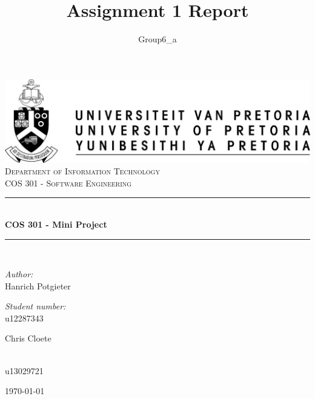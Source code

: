 \documentclass[a4paper,12pt]{report}
\author{Group6_a}
\title{ Assignment 1 Report}
\newcommand{\HRule}{\rule{\linewidth}{0.5mm}}
\begin{document}
\setlength{\parskip}{6pt}

\begin{titlepage}

\begin{center}
\includegraphics[width=1\textwidth]{./up-logo.jpg}\\[0.4cm]    
\textsc{\LARGE Department of Information Technology}\\[1.5cm]
\textsc{\Large COS 301 - Software Engineering}\\[0.5cm]
\HRule \\[0.4cm]
{ \huge \bfseries COS 301 - Mini Project}\\[0.4cm]
\HRule \\[0.4cm]
\begin{minipage}{0.4\textwidth}
\begin{flushleft} \large
\emph{Author:}\\
Hanrich {Potgieter}
\end{flushleft}
\end{minipage}
\begin{minipage}{0.4\textwidth}
\begin{flushright} \large
\emph{Student number:} \\
u12287343
\end{flushright}
\end{minipage}
\begin{minipage}{0.4\textwidth}
\begin{flushleft} \large
Chris {Cloete}
\end{flushleft}
\end{minipage}
\begin{minipage}{0.4\textwidth}
\begin{flushright} \large
\emph{} \\
u13029721
\end{flushright}
\end{minipage}
\vfill
{\large \today}
\end{center}
\end{titlepage}
\footnotesize

\normalsize
\end{document}
